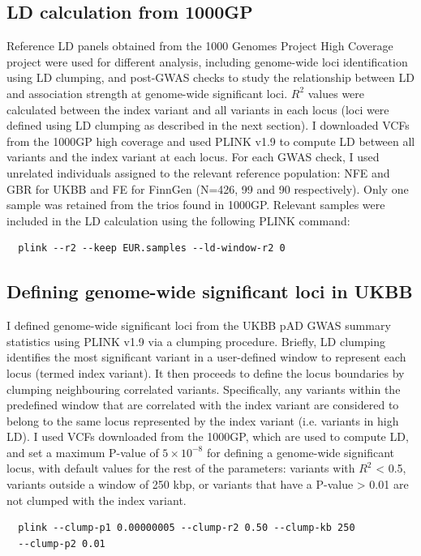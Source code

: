 \subsection{LD calculation from 1000GP}
Reference LD panels obtained from the 1000 Genomes Project High Coverage project \cite{1000gphc} were used for different analysis, including genome-wide loci identification using LD clumping, and post-GWAS checks to study the relationship between LD and association strength at genome-wide significant loci. $R^{2}$ values were calculated between the index variant and all variants in each locus (loci were defined using LD clumping as described in the next section). I downloaded VCFs from the 1000GP high coverage and used PLINK v1.9 to compute LD between all variants and the index variant at each locus. For each GWAS check, I used unrelated individuals assigned to the relevant reference population: NFE and GBR for UKBB and FE for FinnGen (N=426, 99 and 90 respectively). Only one sample was retained from the trios found in 1000GP. Relevant samples were included in the LD calculation using the following PLINK command:
\begin{verbatim}
  plink --r2 --keep EUR.samples --ld-window-r2 0 
\end{verbatim}

\subsection{Defining genome-wide significant loci in UKBB}
I defined genome-wide significant loci from the UKBB pAD GWAS summary statistics using PLINK v1.9 via a clumping procedure. Briefly, LD clumping identifies the most significant variant in a user-defined window to represent each locus (termed index variant). It then proceeds to define the locus boundaries by clumping neighbouring correlated variants. Specifically, any variants within the predefined window that are correlated with the index variant are considered to belong to the same locus represented by the index variant (i.e. variants in high LD). I used VCFs downloaded from the 1000GP, which are used to compute LD, and set a maximum P-value of $5\times10^{-8}$ for defining a genome-wide significant locus, with default values for the rest of the parameters: variants with $R^{2}$ < 0.5, variants outside a window of 250 kbp, or variants that have a P-value > 0.01 are not clumped with the index variant.
\begin{verbatim}
  plink --clump-p1 0.00000005 --clump-r2 0.50 --clump-kb 250 
  --clump-p2 0.01
\end{verbatim}

